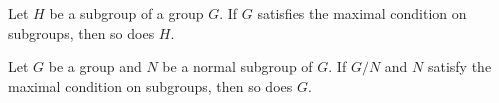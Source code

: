 
\begin{exercise}
Let $H$ be a subgroup of a group $G$. If $G$ satisfies 
the maximal condition on subgroups, then so does $H$. 
\end{exercise}

\begin{exercise}
\label{xca:max:G/N}
Let $G$ be a group and $N$ be a normal subgroup of $G$. If $G/N$ and $N$
satisfy the maximal condition on subgroups, then so does $G$.
\end{exercise}



